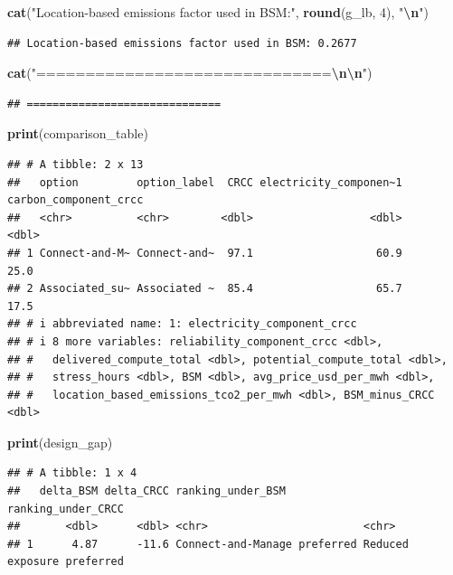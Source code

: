 \documentclass[
]{article}
\newenvironment{Shaded}{\begin{snugshade}}{\end{snugshade}}
\newcommand{\DecValTok}[1]{\textcolor[rgb]{0.00,0.00,0.81}{#1}}
\newcommand{\FunctionTok}[1]{\textcolor[rgb]{0.13,0.29,0.53}{\textbf{#1}}}
\newcommand{\NormalTok}[1]{#1}
\newcommand{\SpecialCharTok}[1]{\textcolor[rgb]{0.81,0.36,0.00}{\textbf{#1}}}
\newcommand{\StringTok}[1]{\textcolor[rgb]{0.31,0.60,0.02}{#1}}
\begin{document}
\begin{Shaded}
\begin{Highlighting}[]
\FunctionTok{cat}\NormalTok{(}\StringTok{"Location{-}based emissions factor used in BSM:"}\NormalTok{, }\FunctionTok{round}\NormalTok{(g\_lb, }\DecValTok{4}\NormalTok{), }\StringTok{"}\SpecialCharTok{\textbackslash{}n}\StringTok{"}\NormalTok{)}
\end{Highlighting}
\end{Shaded}

\begin{verbatim}
## Location-based emissions factor used in BSM: 0.2677
\end{verbatim}

\begin{Shaded}
\begin{Highlighting}[]
\FunctionTok{cat}\NormalTok{(}\StringTok{"==============================}\SpecialCharTok{\textbackslash{}n\textbackslash{}n}\StringTok{"}\NormalTok{)}
\end{Highlighting}
\end{Shaded}

\begin{verbatim}
## ==============================
\end{verbatim}

\begin{Shaded}
\begin{Highlighting}[]
\FunctionTok{print}\NormalTok{(comparison\_table)}
\end{Highlighting}
\end{Shaded}

\begin{verbatim}
## # A tibble: 2 x 13
##   option         option_label  CRCC electricity_componen~1 carbon_component_crcc
##   <chr>          <chr>        <dbl>                  <dbl>                 <dbl>
## 1 Connect-and-M~ Connect-and~  97.1                   60.9                  25.0
## 2 Associated_su~ Associated ~  85.4                   65.7                  17.5
## # i abbreviated name: 1: electricity_component_crcc
## # i 8 more variables: reliability_component_crcc <dbl>,
## #   delivered_compute_total <dbl>, potential_compute_total <dbl>,
## #   stress_hours <dbl>, BSM <dbl>, avg_price_usd_per_mwh <dbl>,
## #   location_based_emissions_tco2_per_mwh <dbl>, BSM_minus_CRCC <dbl>
\end{verbatim}

\begin{Shaded}
\begin{Highlighting}[]
\FunctionTok{print}\NormalTok{(design\_gap)}
\end{Highlighting}
\end{Shaded}

\begin{verbatim}
## # A tibble: 1 x 4
##   delta_BSM delta_CRCC ranking_under_BSM            ranking_under_CRCC        
##       <dbl>      <dbl> <chr>                        <chr>                     
## 1      4.87      -11.6 Connect-and-Manage preferred Reduced exposure preferred
\end{verbatim}
\end{document}
